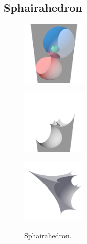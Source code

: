 \documentclass[dvipdfmx]{interact}
\theoremstyle{plain}%
\theoremstyle{definition}
\theoremstyle{remark}
\theoremstyle{problemstyle}
\begin{document}
\subsection{Sphairahedron}

\begin{figure}[h!tbp]
  \begin{minipage}[t]{0.3\textwidth}
   \centering
   \includegraphics[width=1.2in, height=1.2in, keepaspectratio]
   {./img/sphairahedralPrism/sphairaAll.png}
   \label{fig:sphairaPrismAll}
  \end{minipage}
  \hspace*{\fill}
  \begin{minipage}[t]{0.3\textwidth}
   \centering
   \includegraphics[width=1.2in, height=1.2in, keepaspectratio]
   {./img/sphairahedralPrism/sphairaHalf.png}
   \label{fig:sphairaPrismHalf}
  \end{minipage}
  \hspace*{\fill}
  \begin{minipage}[t]{0.3\textwidth}
   \centering
   \includegraphics[width=1.2in, height=1.2in,
   keepaspectratio]{./img/sphairahedralPrism/sphairahedron.png} 
   \label{fig:sphairahedronFinite}
  \end{minipage}
  \hspace*{\fill}
  \caption{Sphairahedron.}
  \label{fig:sphairahedron}
 \end{figure}
\end{document}
